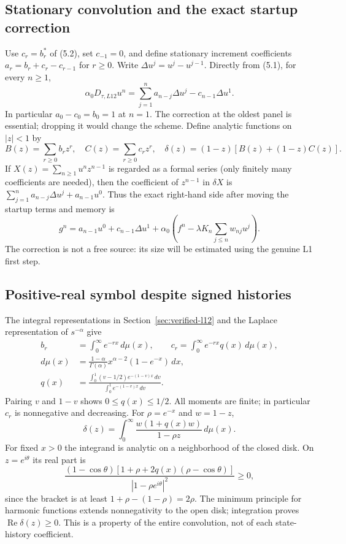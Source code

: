 \documentclass[11pt,a4paper]{amsart}
\theoremstyle{remark}
\theoremstyle{plain}
\theoremstyle{remark}
\numberwithin{equation}{section}
\begin{document}
\subsection{Stationary convolution and the exact startup correction}
Use $c_r=b_r^*$ of (5.2), set $c_{-1}=0$, and define stationary increment coefficients $a_r=b_r+c_r-c_{r-1}$ for $r\ge0$. Write $\Delta u^j=u^j-u^{j-1}$. Directly from (5.1), for every $n\ge1$,
\begin{equation}\label{eq:sp02-start}
 \alpha_0D_{\tau,L12}u^n=\sum_{j=1}^na_{n-j}\Delta u^j-c_{n-1}\Delta u^1.
\end{equation}
In particular $a_0-c_0=b_0=1$ at $n=1$. The correction at the oldest panel is essential; dropping it would change the scheme. Define analytic functions on $|z|<1$ by
\[
 B(z)=\sum_{r\ge0}b_rz^r,\quad C(z)=\sum_{r\ge0}c_rz^r,\quad
 \delta(z)=(1-z)[B(z)+(1-z)C(z)].
\]
If $X(z)=\sum_{n\ge1}u^nz^{n-1}$ is regarded as a formal series (only finitely many coefficients are needed), then the coefficient of $z^{n-1}$ in $\delta X$ is $\sum_{j=1}^na_{n-j}\Delta u^j+a_{n-1}u^0$. Thus the exact right-hand side after moving the startup terms and memory is
\begin{equation}\label{eq:sp02-RHS}
 g^n=a_{n-1}u^0+c_{n-1}\Delta u^1+\alpha_0(f^n-\lambda K_n\sum_{j\le n}w_{nj}u^j).
\end{equation}
The correction is not a free source: its size will be estimated using the genuine L1 first step.

\subsection{Positive-real symbol despite signed histories}
The integral representations in Section~\ref{sec:verified-l12} and the Laplace representation of $s^{-\alpha}$ give
\begin{align*}
 b_r&=\int_0^\infty e^{-rx}\,d\mu(x),\qquad
 c_r=\int_0^\infty e^{-rx}q(x)\,d\mu(x),\\
 d\mu(x)&=\frac{1-\alpha}{\Gamma(\alpha)}x^{\alpha-2}(1-e^{-x})\,dx,\\
 q(x)&=\frac{\int_0^1(v-1/2)e^{-(1-v)x}\,dv}{\int_0^1e^{-(1-v)x}\,dv}.
\end{align*}
Pairing $v$ and $1-v$ shows $0\le q(x)\le1/2$. All moments are finite; in particular $c_r$ is nonnegative and decreasing. For $\rho=e^{-x}$ and $w=1-z$,
\begin{equation}\label{eq:sp02-symbol}
 \delta(z)=\int_0^\infty\frac{w(1+q(x)w)}{1-\rho z}\,d\mu(x).
\end{equation}
For fixed $x>0$ the integrand is analytic on a neighborhood of the closed disk. On $z=e^{i\theta}$ its real part is
\begin{equation}\label{eq:sp02-positive}
 \frac{(1-\cos\theta)[1+\rho+2q(x)(\rho-\cos\theta)]}{|1-\rho e^{i\theta}|^2}\ge0,
\end{equation}
since the bracket is at least $1+\rho-(1-\rho)=2\rho$. The minimum principle for harmonic functions extends nonnegativity to the open disk; integration proves $\operatorname{Re}\delta(z)\ge0$. This is a property of the entire convolution, not of each state-history coefficient.
\end{document}

